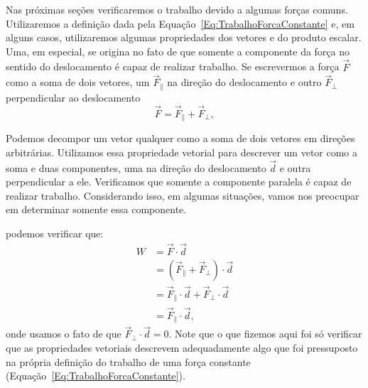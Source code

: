 Nas próximas seções verificaremos o trabalho devido a algumas forças comuns. Utilizaremos a definição dada pela Equação~\ref{Eq:TrabalhoForcaConstante} e, em alguns casos, utilizaremos algumas propriedades dos vetores e do produto escalar. Uma, em especial, se origina no fato de que somente a componente da força no sentido do deslocamento é capaz de realizar trabalho. Se escrevermos a força $\vec{F}$ como a soma de dois vetores, um $\vec{F}_{\parallel}$ na direção do deslocamento e outro $\vec{F}_{\perp}$ perpendicular ao deslocamento
\begin{equation}
    \vec{F} = \vec{F}_{\parallel} + \vec{F}_{\perp},
\end{equation}
%
\begin{marginfigure}
\centering
{}
\caption{Podemos decompor um vetor qualquer como a soma de dois vetores em direções arbitrárias. Utilizamos essa propriedade vetorial para descrever um vetor como a soma e duas componentes, uma na direção do deslocamento $\vec{d}$ e outra perpendicular a ele. Verificamos que somente a componente paralela é capaz de realizar trabalho. Considerando isso, em algumas situações, vamos nos preocupar em determinar somente essa componente.}
\end{marginfigure}
%
\noindent{}podemos verificar que:
\begin{align}
    W &= \vec{F}\cdot\vec{d} \\
    &= (\vec{F}_{\parallel} + \vec{F}_{\perp})\cdot\vec{d} \\
    &= \vec{F}_{\parallel} \cdot \vec{d} + \vec{F}_{\perp} \cdot \vec{d} \\
    &= \vec{F}_{\parallel} \cdot \vec{d},
\end{align}
%
onde usamos o fato de que $\vec{F}_{\perp} \cdot \vec{d} = 0$. Note que o que fizemos aqui foi só verificar que as propriedades vetoriais descrevem adequadamente algo que foi pressuposto na própria definição do trabalho de uma força constante (Equação~\ref{Eq:TrabalhoForcaConstante}).


